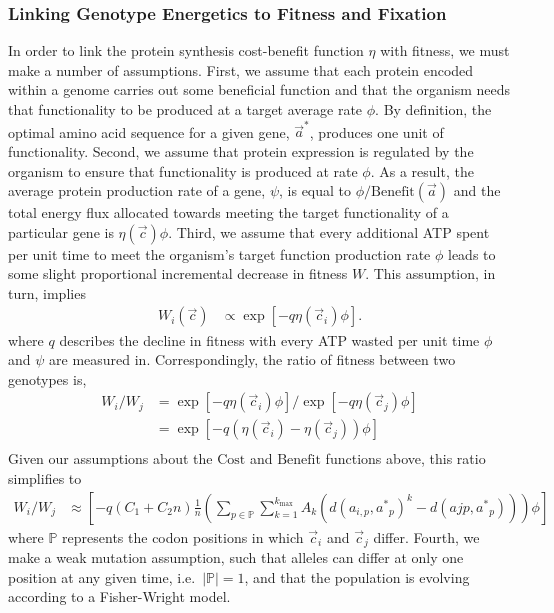 \documentclass{article}
\newcommand{\setP}{\ensuremath{\mathbb{P}}\xspace}
\newcommand{\kmax}{\ensuremath{{k_{\max}}}\xspace}
\newcommand{\cvec}{\ensuremath{\Vec{c}}\xspace}
\newcommand{\cveci}{\ensuremath{\cvec_i}\xspace}
\newcommand{\cvecj}{\ensuremath{\cvec_j}\xspace}
\newcommand{\aip}{\ensuremath{a_{i,p}}\xspace}
\newcommand{\avec}{\ensuremath{\Vec{a}}\xspace}
\newcommand{\aopt}{\ensuremath{a^*}\xspace}
\newcommand{\aoptp}{\ensuremath{\aopt_p}\xspace}
\newcommand{\aoptvec}{\ensuremath{\Vec{a}^*}\xspace}
\newcommand{\Cost}{\ensuremath{\text{Cost}}\xspace}
\newcommand{\Func}{\ensuremath{\text{Benefit}}\xspace}
\begin{document}
\subsubsection*{Linking Genotype Energetics to Fitness and Fixation}
In order to link the protein synthesis cost-benefit function $\eta$ with fitness, we must make a number of assumptions.
First, we assume that each protein encoded within a genome carries out some beneficial function and that the organism needs that functionality to be produced at a target average rate $\phi$.
By definition, the optimal amino acid sequence for a given gene, \aoptvec, produces one unit of functionality.
Second, we assume that protein expression is regulated by the organism to ensure that functionality is produced at rate $\phi$.
As a result, the average protein production rate of a gene, $\psi$, is equal to $\phi/\Func(\avec)$ and the total energy flux allocated towards meeting the target functionality of a particular gene is $\eta(\cvec) \phi$. 
Third, we assume that every additional ATP spent per unit time to meet the organism's target function production rate $\phi$ leads to some slight proportional incremental decrease in fitness $W$.
This assumption, in turn, implies 
\begin{align}
  W_i\left(\cvec\right) &\propto \exp\left[- q \eta(\cveci) \phi\right].
\end{align}
where $q$ describes the decline in fitness with every ATP wasted per unit time $\phi$ and $\psi$ are measured in.
Correspondingly, the ratio of fitness between two genotypes is,
\begin{align*}
  W_i/W_j &=  \exp\left[- q \eta(\cveci) \phi\right]/\exp\left[- q \eta(\cvecj) \phi\right]\\
  &=  \exp\left[- q \left(\eta(\cveci)- \eta(\cvecj)\right) \phi\right]\\
\end{align*}
Given our assumptions about the \Cost and \Func functions above, this ratio simplifies to
\begin{align}
  W_i/W_j &\approx \left[- q \left(C_1 + C_2 n\right) \frac{1}{n}\left(\sum_{p \in \setP} \sum_{k=1}^\kmax A_k \left(d\left(\aip,\aoptp\right)^k - d\left(ajp,\aoptp\right)\right)\right) \phi \right]
\end{align}
where \setP represents the codon positions in which \cveci and \cvecj differ.
Fourth, we make a weak mutation assumption, such that alleles can differ at only one position at any given time, i.e.~$|\setP| = 1$, and that the population is evolving according to a Fisher-Wright model.
\end{document}
